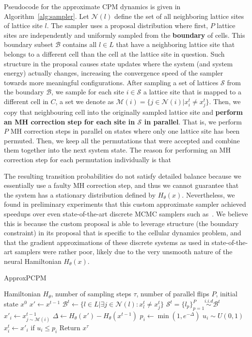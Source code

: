 Pseudocode for the approximate CPM dynamics is given in Algorithm~\ref{alg:sampler}. Let $\mathcal{N}(l)$ define the set of all neighboring lattice sites of lattice site $l$. The sampler uses a proposal distribution where first, $P$ lattice sites are independently and uniformly sampled from the \textbf{boundary} of cells. This boundary subset $\mathcal{B}$ contains all $l \in L$ that have a neighboring lattice site that belongs to a different cell than the cell at the lattice site in question. Such structure in the proposal causes state updates where the system (and system energy) actually changes, increasing the convergence speed of the sampler towards more meaningful configurations. After sampling a set of lattices $\mathcal{S}$ from the boundary $\mathcal{B}$, we sample for each site $i \in \mathcal{S}$ a lattice site that is mapped to a different cell in $C$, a set we denote as $\mathcal{M}(i) = \{j \in \mathcal{N}(i)|x^t_i \neq x_j^t\}$. Then, we copy that neighbouring cell into the originally sampled lattice site and \textbf{perform an MH correction step for each site in $\mathcal{S}$ in parallel}. That is, we perform $P$ MH correction steps in parallel on states where only one lattice site has been permuted. Then, we keep all the permutations that were accepted and combine them together into the next system state. The reason for performing an MH correction step for each permutation individually is that 

The resulting transition probabilities do not satisfy detailed balance because we essentially use a faulty MH correction step, and thus we cannot guarantee that the system has a stationary distribution defined by $H_\theta(x)$. Nevertheless, we found in preliminary experiments that this custom approximate sampler achieved speedups over even state-of-the-art discrete MCMC samplers such as~\cite{grathwohl2021oops, zhang2022langevin, sun2023discrete}. We believe this is because the custom proposal is able to leverage structure (the boundary constraint) in its proposal that is specific to the cellular dynamics problem, and that the gradient approximations of these discrete systems as used in state-of-the-art samplers were rather poor, likely due to the very unsmooth nature of the neural Hamiltonian $H_\theta(x)$.
\begin{algorithm}[tb]
   \caption{ApproxPCPM}
   \label{alg:sampler}
\begin{algorithmic}
    Hamiltonian $H_\theta$, number of sampling steps $\tau$, number of parallel flips $P$, initial state $x^0$
    \STATE $x' \leftarrow x^{t-1}$
    \STATE $\mathcal{B}^t \leftarrow \{l \in L| \exists j \in \mathcal{N}(l): x^t_l \neq x^t_j \}$
    \STATE $\mathcal{S}^t = \{l_p\}^P_{p=1}\overset{i.i.d}{\sim}\mathcal{B}^t$
    \STATE $x'_i \leftarrow x^{t-1}_{j\sim \mathcal{M}(i)}$
    \STATE $\Delta \leftarrow H_\theta(x') - H_\theta(x^{t-1})$
    \STATE $p_i \leftarrow \min(1, e^{-\Delta})$
    \STATE $u_i \sim U(0, 1)$
    \STATE $x_i^t \leftarrow x'_i$ if $u_i \leq p_i$
    \ENDFOR
    \ENDFOR
    \STATE Return $x^\tau$
\end{algorithmic}
\end{algorithm}
